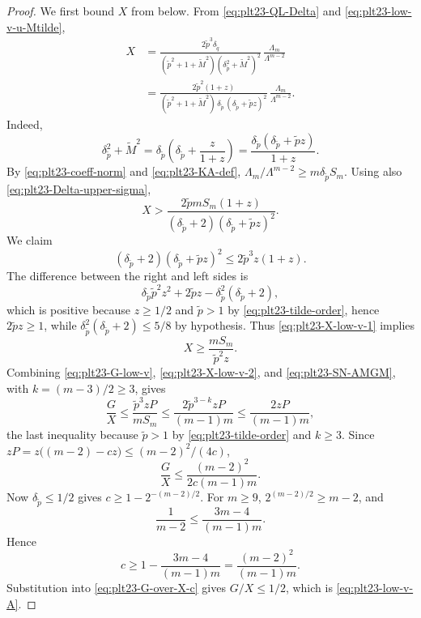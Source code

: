 ﻿\documentclass[11pt]{article}
\numberwithin{equation}{section}
\begin{document}
\begin{proof}
  We first bound $X$ from below.
  From \eqref{eq:plt23-QL-Delta} and \eqref{eq:plt23-low-v-u-Mtilde},
  \begin{align*}
    X
    &=\frac{2\tilde p^3\delta_{\tilde q}}
            {(\tilde p^2+1+\tilde M^2)(\delta_{\tilde p}^2+\tilde M^2)^2}\,
      \frac{\Lambda_m}{\Lambda^{m-2}}\\
    &=\frac{2\tilde p^2(1+z)}
            {(\tilde p^2+1+\tilde M^2)\,\delta_{\tilde p}\,(\delta_{\tilde p}+\tilde pz)^2}\,
      \frac{\Lambda_m}{\Lambda^{m-2}}.
  \end{align*}
  Indeed,
  \[
    \delta_{\tilde p}^2+\tilde M^2
    =\delta_{\tilde p}\left(\delta_{\tilde p}+\frac{z}{1+z}\right)
    =\frac{\delta_{\tilde p}(\delta_{\tilde p}+\tilde pz)}{1+z}.
  \]
  By \eqref{eq:plt23-coeff-norm} and \eqref{eq:plt23-KA-def}, $\Lambda_m/\Lambda^{m-2}\ge m\delta_{\tilde p}S_m$.
  Using also \eqref{eq:plt23-Delta-upper-sigma},
  \begin{equation}\label{eq:plt23-X-low-v-1}
    X
    >\frac{2\tilde pmS_m(1+z)}
            {(\delta_{\tilde p}+2)(\delta_{\tilde p}+\tilde pz)^2}.
  \end{equation}
  We claim
  \[
    (\delta_{\tilde p}+2)(\delta_{\tilde p}+\tilde pz)^2
    \le2\tilde p^3z(1+z).
  \]
  The difference between the right and left sides is
  \[
    \delta_{\tilde p}\tilde p^2z^2+2\tilde pz-\delta_{\tilde p}^2(\delta_{\tilde p}+2),
  \]
  which is positive because $z\ge1/2$ and $\tilde p>1$ by \eqref{eq:plt23-tilde-order}, hence $2\tilde pz\ge1$, while $\delta_{\tilde p}^2(\delta_{\tilde p}+2)\le5/8$ by hypothesis.
  Thus \eqref{eq:plt23-X-low-v-1} implies
  \begin{equation}\label{eq:plt23-X-low-v-2}
    X\ge\frac{mS_m}{\tilde p^2z}.
  \end{equation}
  Combining \eqref{eq:plt23-G-low-v}, \eqref{eq:plt23-X-low-v-2}, and \eqref{eq:plt23-SN-AMGM}, with $k=(m-3)/2\ge3$, gives
  \begin{equation}\label{eq:plt23-G-over-X}
    \frac GX
    \le
    \frac{\tilde p^3zP}{mS_m}
    \le
    \frac{2\tilde p^{3-k}zP}{(m-1)m}
    \le
    \frac{2zP}{(m-1)m},
  \end{equation}
  the last inequality because $\tilde p>1$ by \eqref{eq:plt23-tilde-order} and $k\ge3$.
  Since $zP=z\bigl((m-2)-cz\bigr)\le(m-2)^2/(4c)$,
  \begin{equation}\label{eq:plt23-G-over-X-c}
    \frac GX
    \le\frac{(m-2)^2}{2c(m-1)m}.
  \end{equation}
  Now $\delta_{\tilde p}\le1/2$ gives $c\ge1-2^{-(m-2)/2}$.
  For $m\ge9$, $2^{(m-2)/2}\ge m-2$, and
  \[
    \frac1{m-2}\le\frac{3m-4}{(m-1)m}.
  \]
  Hence
  \[
    c\ge
    1-\frac{3m-4}{(m-1)m}
    =\frac{(m-2)^2}{(m-1)m}.
  \]
  Substitution into \eqref{eq:plt23-G-over-X-c} gives $G/X\le1/2$, which is \eqref{eq:plt23-low-v-A}.


\end{proof}
\end{document}
